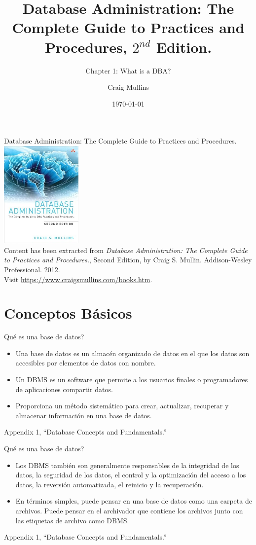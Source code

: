 \documentclass{beamer}
\title[Chapter 1]{Database Administration: The Complete Guide to Practices and Procedures, $2^{nd}$  Edition.}
\subtitle{Chapter 1: What is a DBA?}
\author{Craig Mullins}
\date{\today}
\newcommand{\toRight}[1]{
    \begin{FlushRight}
        {\tiny #1}
    \end{FlushRight}
} %
\begin{document}
\frame{\titlepage}

\begin{frame}{Database Administration: The Complete Guide to Practices and Procedures.}
    \centering
    \includegraphics[width=0.3\textwidth]{figures/book_cover.jpg} \\
    \vspace{5mm}
    {
        \tiny
        Content has been extracted from \textit{Database Administration: The Complete Guide to Practices and Procedures.}, Second Edition, by Craig S. Mullin. Addison-Wesley Professional. 2012.\\
        Visit \url{https://www.craigsmullins.com/books.htm}.\\
    }
\end{frame}

\section{Conceptos Básicos}

\begin{frame}{Qué es una base de datos?}
    \begin{itemize}
        \item Una base de datos es un almacén organizado de datos en el que los datos son accesibles por elementos de datos con nombre. 
        \item Un DBMS es un software que permite a los usuarios finales o programadores de aplicaciones compartir datos.
        \item Proporciona un método sistemático para crear, actualizar, recuperar y almacenar información en una base de datos.
    \end{itemize}
    \toRight{Appendix 1, “Database Concepts and Fundamentals.”}
\end{frame}

\begin{frame}{Qué es una base de datos?}
    \begin{itemize}
        \item Los DBMS también son generalmente responsables de la integridad de los datos, la seguridad de los datos, el control y la optimización del acceso a los datos, la reversión automatizada, el reinicio y la recuperación. 
        \item En términos simples, puede pensar en una base de datos como una carpeta de archivos. Puede pensar en el archivador que contiene los archivos junto con las etiquetas de archivo como DBMS.
    \end{itemize}
    \toRight{Appendix 1, “Database Concepts and Fundamentals.”}
\end{frame}
\end{document}

